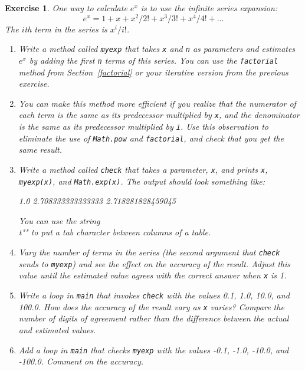 \documentclass[12pt]{book}
\theoremstyle{exercise}
\newtheorem{exercise}{Exercise}[chapter]
\newcommand{\java}[1]{\verb"#1"}
\newcommand{\java}[1]{\lstinline{#1}} %
\begin{document}
\begin{exercise}

One way to calculate $e^x$ is to use the infinite series expansion:
%
\[ e^x = 1 + x + x^2 / 2! + x^3 / 3! + x^4 / 4! + ... \]
%
The $i$th term in the series is $x^i / i!$.

\begin{enumerate}

\item Write a method called \java{myexp} that takes \java{x} and \java{n} as parameters and estimates $e^x$ by adding the first \java{n} terms of this series.
You can use the \java{factorial} method from Section~\ref{factorial} or your iterative version from the previous exercise.

\item You can make this method more efficient if you realize that the numerator of each term is the same as its predecessor multiplied by \java{x}, and the denominator is the same as its predecessor multiplied by \java{i}.
Use this observation to eliminate the use of \java{Math.pow} and \java{factorial}, and check that you get the same result.

\item Write a method called \java{check} that takes a parameter, \java{x}, and prints \java{x}, \java{myexp(x)}, and \java{Math.exp(x)}.
The output should look something like:

\begin{stdout}
1.0     2.708333333333333     2.718281828459045
\end{stdout}

You can use the string \java{"\\t"} to put a tab character between columns of a table.

\item Vary the number of terms in the series (the second argument that \java{check} sends to \java{myexp}) and see the effect on the accuracy of the result.
Adjust this value until the estimated value agrees with the correct answer when \java{x} is 1.

\item Write a loop in \java{main} that invokes \java{check} with the values 0.1, 1.0, 10.0, and 100.0.
How does the accuracy of the result vary as \java{x} varies?
Compare the number of digits of agreement rather than the difference between the actual and estimated values.

\item Add a loop in \java{main} that checks \java{myexp} with the values -0.1, -1.0, -10.0, and -100.0.
Comment on the accuracy.

\end{enumerate}

\end{exercise}
\end{document}
